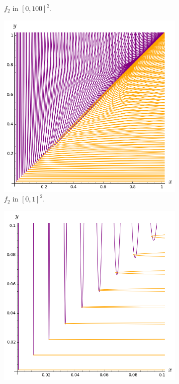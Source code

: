 \documentclass{beamer}
\begin{document}
\begin{frame}
\begin{figure}
\begin{subfigure}{.28\linewidth}
\vspace{-0.1cm}\caption{$f_2$ in $[0, 100]^2$.}
\end{subfigure} \hspace{0.4cm}
\begin{subfigure}{.28\linewidth}\centering
\includegraphics[width=1\textwidth]{plots/ch5_30_3curves4.png}
\vspace{-0.1cm}\caption{$f_2$ in $[0, 1]^2$.}
\end{subfigure} \hspace{0.4cm}
\begin{subfigure}{.28\linewidth}\centering
\includegraphics[width=1\textwidth]{plots/ch5_30_3curves5.png}

\end{subfigure}
\end{figure}
\end{frame}
\end{document}
